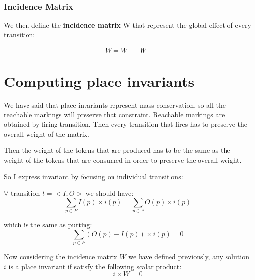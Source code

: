 \subsubsection{Incidence Matrix}
We then define the \textbf{incidence matrix} W that represent the global effect of every transition:

\begin{equation*}
    W = W^{+} - W^{-}
\end{equation*}

\section{Computing place invariants}
We have said that place invariants represent mass conservation, so all the reachable markings will preserve that constraint. Reachable markings are obtained by firing transition. Then every transition that fires has to preserve the overall weight of the matrix.\par
Then the weight of the tokens that are produced has to be the same as the weight of the tokens that are consumed in order to preserve the overall weight.\par
So I express invariant by focusing on individual transitions:\par
$\forall$ transition $t = <I, O>$ we should have:
\begin{equation*}
    \sum_{p \in P} I(p) \times i(p) = \sum_{p \in P}O(p) \times i(p)
\end{equation*}

which is the same as putting:
\begin{equation*}
    \sum_{p \in P} (O(p) - I(p)) \times i(p) = 0
\end{equation*}

Now considering the incidence matrix $W$ we have defined previously, any solution $i$ is a place invariant if satisfy the following scalar product:
\begin{equation*}
    i \times W = 0
\end{equation*}
